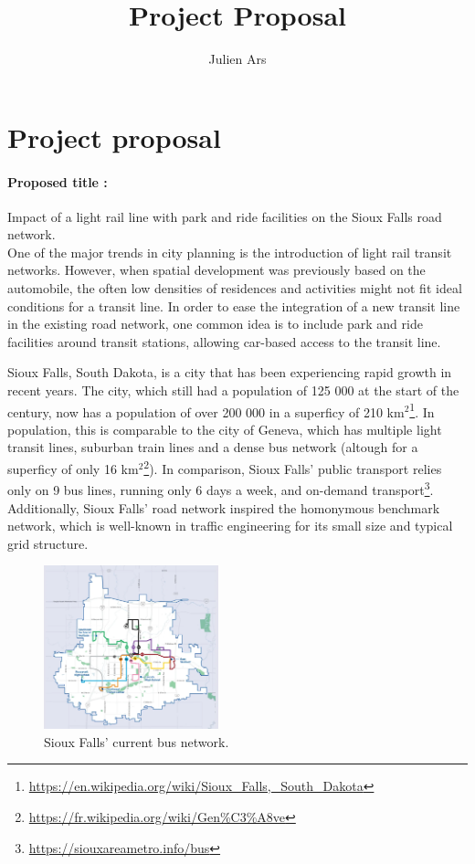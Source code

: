 \documentclass[10pt]{article}
\title{Project Proposal}
\author{Julien Ars}
\begin{document}
\makecover

\newpage

\section*{Project proposal}

\paragraph{Proposed title : } Impact of a light rail line with park and ride facilities on the Sioux Falls road network.\\[1em]
One of the major trends in city planning is the introduction of light rail transit networks. However, when spatial development was previously based on the automobile, the often low densities of residences and activities might not fit ideal conditions for a transit line. In order to ease the integration of a new transit line in the existing road network, one common idea is to include park and ride facilities around transit stations, allowing car-based access to the transit line.

Sioux Falls, South Dakota, is a city that has been experiencing rapid growth in recent years. The city, which still had a population of 125 000 at the start of the century, now has a population of over 200 000 in a superficy of 210 km$^2$\footnote{\url{https://en.wikipedia.org/wiki/Sioux_Falls,_South_Dakota}}. In population, this is comparable to the city of Geneva, which has multiple light transit lines, suburban train lines and a dense bus network (altough for a superficy of only 16 km$^2$\footnote{\url{https://fr.wikipedia.org/wiki/Gen\%C3\%A8ve}}). In comparison, Sioux Falls' public transport relies only on 9 bus lines, running only 6 days a week, and on-demand transport\footnote{\url{https://siouxareametro.info/bus}}. Additionally, Sioux Falls' road network inspired the homonymous benchmark network, which is well-known in traffic engineering for its small size and typical grid structure.

\begin{figure}
    \centering
    \includegraphics[keepaspectratio,width=0.45\textwidth]{Figures/siouxfalls_bus_network.png}
    \caption{Sioux Falls' current bus network.}
    \label{fig:sioux_falls_bus_network}
\end{figure}
\end{document}
